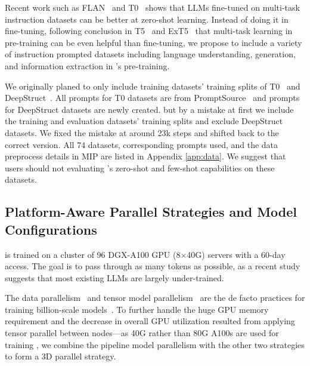 {
Recent work such as FLAN~\citep{wei2022finetuned} and T0~\citep{sanh2022multitask} shows that LLMs fine-tuned on multi-task instruction datasets can be better at zero-shot learning.
Instead of doing it in fine-tuning, following conclusion in T5~\citep{raffel2020exploring} and ExT5~\citep{aribandi2022ext5} that multi-task learning in pre-training can be even helpful than fine-tuning, we propose to include a variety of instruction prompted datasets including language understanding, generation, and information extraction in \glm's pre-training.

We originally planed to only include training datasets' training splits of T0~\citep{sanh2022multitask} and DeepStruct~\citep{wang2022deepstruct}.
All prompts for T0 datasets are from PromptSource~\citep{bach2022promptsource} and prompts for DeepStruct datasets are newly created.
but by a mistake at first we include the training and evaluation datasets' training splits and exclude DeepStruct datasets. 
We fixed the mistake at around 23k steps and shifted back to the correct version. 
All 74 datasets, corresponding prompts used, and the data preprocess details in MIP are listed in Appendix \ref{app:data}.
We suggest that users should not evaluating \glm's zero-shot and few-shot capabilities on these datasets.

}%

\subsection{Platform-Aware Parallel Strategies and Model Configurations} \label{sec:parallel_strategy}

\glm is trained on a cluster of 96 DGX-A100 GPU (8$\times$40G) servers with a 60-day access.  
The goal is to pass through as many tokens as possible, as a recent study~\citep{hoffmann2022training} suggests that most existing LLMs are largely under-trained. 

The data parallelism~\citep{valiant1990bridging} and tensor model parallelism~\citep{shoeybi2019megatron} are the de facto practices for training billion-scale models~\citep{gpt-j,du2022glm}. 
To further handle
the huge GPU memory requirement and the decrease in overall GPU utilization resulted from applying tensor parallel between nodes---as 40G rather than 80G A100s are used for training \glm, we combine the pipeline model parallelism with the other two strategies to form a 3D parallel strategy. 

